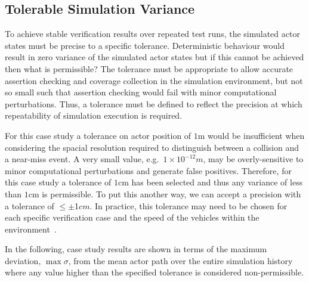 \subsection{Tolerable Simulation Variance}\label{s:tolerance}
To achieve stable verification results over repeated test runs, the simulated actor states must be precise to a specific tolerance. Deterministic behaviour would result in zero variance of the simulated actor states but if this cannot be achieved then what is permissible? The tolerance must be appropriate to allow accurate assertion checking and coverage collection in the simulation environment, but not so small such that assertion checking would fail with minor computational perturbations. Thus, a tolerance must be defined to reflect the precision at which repeatability of simulation execution is required. 

For this case study a tolerance on actor position of $1$m would be insufficient when considering the spacial resolution required to distinguish between a collision and a near-miss event. A very small value, e.g.\ $1\times10^{-12}m$, may be overly-sensitive to minor computational perturbations and generate false positives. Therefore, for this case study a tolerance of $1$cm has been selected and thus any variance of less than $1$cm is permissible. To put this another way, we can accept a precision with a tolerance of $\leq$$\pm$1$cm$. In practice, this tolerance may need to be chosen for each specific verification case and the speed of the vehicles within the environment~\cite{jiang2014intercultural}.

In the following, case study results are shown in terms of the maximum deviation, $\max\sigma$, from the mean actor path over the entire simulation history where any value higher than the specified tolerance is considered non-permissible.



